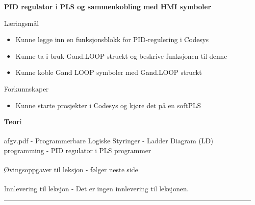 \centerline\textbf{PID regulator i PLS og sammenkobling med HMI symboler}  \bigskip
	Læringsmål
	\begin{itemize}[noitemsep]
		\item Kunne legge inn en funksjonsblokk for PID-regulering i Codesys
		\item Kunne ta i bruk Gand.LOOP struckt og beskrive funksjonen til denne
		\item Kunne koble Gand LOOP symboler med Gand.LOOP struckt
	\end{itemize}

	Forkunnskaper

	\begin{itemize}[noitemsep]
		\item Kunne starte prosjekter i Codesys og kjøre det på en softPLS

	\end{itemize}
\textbf{Teori}\\\\
afgv.pdf - Programmerbare Logiske Styringer - Ladder Diagram (LD) programming - PID regulator i PLS programmer\\\\
Øvingsoppgaver til leksjon - følger neste side\\\\
Innlevering til leksjon - Det er ingen innlevering til leksjonen. 
\bigskip 
\hrule
\vfil \eject
